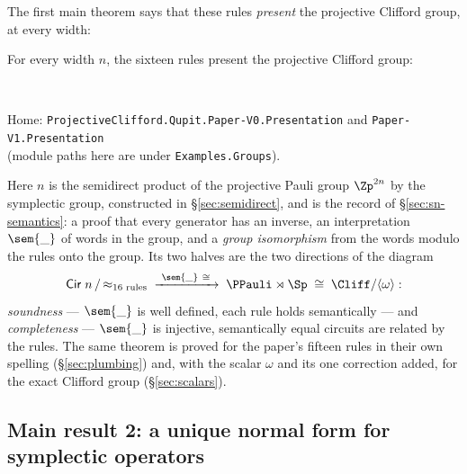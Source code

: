 The first main theorem says that these rules \emph{present} the
projective Clifford group, at every width:

\begin{theorem}\label{thm:main}
For every width $n$, the sixteen rules present the projective Clifford
group:
\begin{code}%
\>[0]\AgdaSpace{}%
\AgdaSymbol{:}\AgdaSpace{}%
\AgdaSpace{}%
\AgdaSymbol{(}\AgdaSpace{}%
\AgdaSymbol{:}\AgdaSpace{}%
\AgdaSymbol{)}\AgdaSpace{}%
\AgdaSpace{}%
\AgdaSymbol{(}\AgdaSpace{}%
\AgdaSymbol{)}\AgdaSpace{}%
\AgdaSpace{}%
\AgdaSymbol{(}\AgdaSpace{}%
\AgdaSymbol{)}\<%
\\
\>[0]\AgdaSpace{}%
\AgdaSymbol{=}\AgdaSpace{}%
\<%
\end{code}
\noindent Home: \texttt{ProjectiveClifford.Qupit.Paper-V0.Presentation}
and \texttt{Paper-V1.Presentation}\\
(module paths here are under \texttt{Examples.Groups}).
\end{theorem}

Here \;$n$ is the semidirect product of the projective
Pauli group $\Zp^{2n}$ by the symplectic group, constructed in
\S\ref{sec:semidirect}, and  is the record
of \S\ref{sec:sn-semantics}: a proof that every generator has an
inverse, an interpretation $\sem{\_}$ of words in the group, and a
\emph{group isomorphism} from the words modulo the rules onto the group.
Its two halves are the two directions of the diagram
\[
  \mathsf{Cir}\;n \,/\, {\approx_{\text{16 rules}}}
  \;\xrightarrow{\ \sem{\_}\ \cong\ }\;
  \PPauli \rtimes \Sp \;\cong\; \Cliff/\langle\omega\rangle :
\]
\emph{soundness} --- $\sem{\_}$ is well defined, each rule holds
semantically --- and \emph{completeness} --- $\sem{\_}$ is injective,
semantically equal circuits are related by the rules.  The same theorem
is proved for the paper's fifteen rules in their own spelling
(\S\ref{sec:plumbing}) and, with the scalar $\omega$ and its one
correction added, for the exact Clifford group (\S\ref{sec:scalars}).

\subsection{Main result 2: a unique normal form for symplectic operators}

